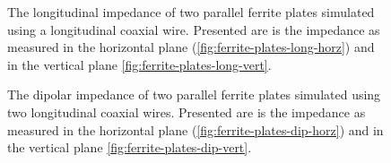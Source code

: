 \documentclass[review, number, sort&compress]{elsarticle}
\begin{document}
\begin{figure}
\caption{The longitudinal impedance of two parallel ferrite plates simulated using a longitudinal coaxial wire. Presented are is the impedance as measured in the horizontal plane (\ref{fig:ferrite-plates-long-horz}) and in the vertical plane \ref{fig:ferrite-plates-long-vert}.}
\label{fig:ferrite-plates-long}
\end{figure}

\begin{figure}
\caption{The dipolar impedance of two parallel ferrite plates simulated using two longitudinal coaxial wires. Presented are is the impedance as measured in the horizontal plane (\ref{fig:ferrite-plates-dip-horz}) and in the vertical plane \ref{fig:ferrite-plates-dip-vert}.}
\label{fig:ferrite-plates-dipolar}
\end{figure}
\end{document}
